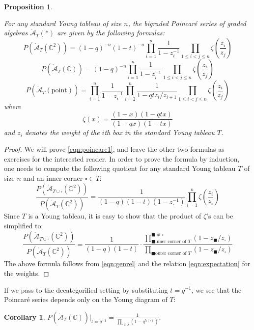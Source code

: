 \documentclass[12pt]{amsart}
\numberwithin{equation}{section}
\newtheorem{proposition}[theorem]{Proposition}
\newtheorem{corollary}[theorem]{Corollary}
\theoremstyle{definition}
\theoremstyle{remark}
\newcommand{\CC}{\mathbb{C}}
\newcommand{\CA}{\mathcal{A}}
\renewcommand{\1}{\mathbf{1}}
\newcommand{\point}{\mathrm{point}}
\newcommand{\sq}{\square}
\newcommand{\bsq}{\blacksquare}
\newcommand{\oCA}{\mathring{\CA}}
\begin{document}
\begin{proposition}
\label{prop:poincare}

For any standard Young tableau of size $n$, the bigraded Poincar\'e series of graded algebras $\oCA_T(*)$ are given by the following formulas:
\begin{equation}
\label{eqn:poincare1}
P(\oCA_T(\CC^2)) = (1-q)^{-n} (1-t)^{-n} \prod_{i=1}^{n} \frac{1}{1-z_i^{-1}} \prod_{1\leq i<j \leq n} \zeta \left(\frac {z_i}{z_j}\right)
\end{equation}
\begin{equation}
\label{eqn:poincare2}
P(\oCA_T(\CC)) = (1-q)^{-n} \prod_{i=1}^{n}\frac{1}{1-z_i^{-1}} \prod_{1\leq i<j \leq n} \zeta \left(\frac {z_i}{z_j}\right)
\end{equation}
\begin{equation}
\label{eqn:poincare3}
P(\oCA_T(\point)) = \prod_{i=1}^{n}\frac{1}{1-z_i^{-1}}  \prod_{i=2}^{n}\frac{1}{1-q t  z_i/z_{i+1}} \prod_{1\leq i<j \leq n} \zeta \left(\frac {z_i}{z_j}\right)
\end{equation}
where
$$
\zeta(x) = \frac {(1 - x)(1 - q t x)}{(1 - q x)(1 - t x)}
$$
and $z_i$ denotes the weight of the \(i\)th box in the standard Young tableau $T$.
\end{proposition}

\begin{proof} We will prove \eqref{eqn:poincare1}, and leave the other two formulas as exercises for the interested reader. In order to prove the formula by induction, one needs to compute the following quotient for any standard Young tableau $T$ of size $n$ and an inner corner $\square \in T$:
$$
\frac {P(\oCA_{T \cup \square} (\CC^2))}{P(\oCA_T(\CC^2))} = \frac 1{(1-q)(1-t)(1-z_{\square}^{-1})} \prod_{i=1}^{n} \zeta \left(\frac {z_i}{z_{\square}}\right)
$$
Since $T$ is a Young tableau, it is easy to show that the product of $\zeta$'s can be simplified to:
$$
\frac {P(\oCA_{T \cup \square} (\CC^2))}{P(\oCA_T(\CC^2))} = \frac 1{(1-q)(1-t)} \cdot \frac {\prod_{\bsq \text{inner corner of }T}^{\bsq \neq \sq} (1-z_{\bsq}/z_{\sq})}{\prod_{\bsq \text{outer corner of }T} (1-z_{\bsq}/z_{\sq})}
$$
The above formula follows from \eqref{eqn:genrel} and the relation \eqref{eqn:expectation} for the weights. \end{proof}

If we pass to the decategorified setting by substituting \(t=q^{-1}\), we see that the Poincar\'e series depends only on the Young diagram of \(T\): 
\begin{corollary}
\label{cor:decat ps}
$ \displaystyle
P(\oCA_T(\CC))|_{t=q^{-1}}=\frac{1}{\prod_{\square\in \lambda}(1-q^{h(\square)})}.
$
\end{corollary}
\end{document}

